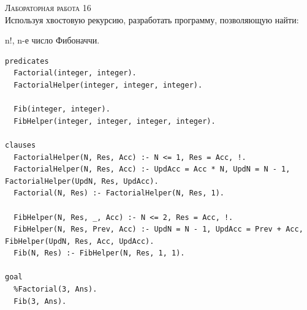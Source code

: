 \textsc{\huge Лабораторная работа 16} \\

Используя хвостовую рекурсию, разработать программу, позволяющую найти:
\begin{tasks}
	\task n!,
	\task n-е число Фибоначчи.
\end{tasks}
\begin{lstlisting}
predicates
  Factorial(integer, integer).
  FactorialHelper(integer, integer, integer).

  Fib(integer, integer).
  FibHelper(integer, integer, integer, integer).

clauses
  FactorialHelper(N, Res, Acc) :- N <= 1, Res = Acc, !.
  FactorialHelper(N, Res, Acc) :- UpdAcc = Acc * N, UpdN = N - 1, FactorialHelper(UpdN, Res, UpdAcc).
  Factorial(N, Res) :- FactorialHelper(N, Res, 1).

  FibHelper(N, Res, _, Acc) :- N <= 2, Res = Acc, !.
  FibHelper(N, Res, Prev, Acc) :- UpdN = N - 1, UpdAcc = Prev + Acc, FibHelper(UpdN, Res, Acc, UpdAcc).
  Fib(N, Res) :- FibHelper(N, Res, 1, 1).

goal
  %Factorial(3, Ans).
  Fib(3, Ans).
\end{lstlisting}

